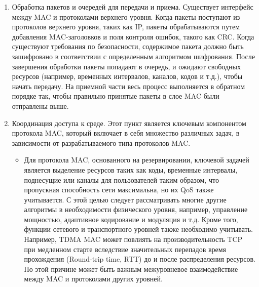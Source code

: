 \documentclass[14pt,a4paper,titlepage]{extarticle}
\begin{document}
\begin{enumerate}
\item Обработка пакетов и очередей для передачи и приема. Существует интерфейс между MAC и протоколами верхнего уровня. Когда пакеты поступают из протоколов верхнего уровня, таких как IP, пакеты обрабатываются путем добавления MAC-заголовков и поля контроля ошибок, такого как CRC. Когда существуют требования по безопасности, содержимое пакета должно быть зашифровано в соответствии с определенным алгоритмом шифрования. После завершения обработки пакеты попадают в очередь, и ожидают свободных ресурсов (например, временных интервалов, каналов, кодов и т.д.), чтобы начать передачу. На приемной части весь процесс выполняется в обратном порядке так, чтобы правильно принятые пакеты в слое MAC были отправлены выше.

\item Координация доступа к среде. Этот пункт является ключевым компонентом протокола MAC, который включает в себя множество различных задач, в зависимости от разрабатываемого типа протоколов MAC.

\begin{itemize}
\item Для протокола MAC, основанного на резервировании, ключевой задачей является выделение ресурсов таких как коды, временные интервалы, поднесущие или каналы для пользователей таким образом, что пропускная способность сети максимальна, но их QoS также учитывается. С этой целью следует рассматривать многие другие алгоритмы в необходимости физического уровня, например, управление мощностью, адаптивное кодирование и модуляция и т.д. Кроме того, функции сетевого и транспортного уровней также необходимо учитывать. Например, TDMA MAC может повлиять на производительность TCP при медленном старте вследствие значительных перепадов время прохождения (Round-trip time, RTT) до и после распределения ресурсов. По этой причине может быть важным межуровневое взаимодействие между MAC и протоколами других уровней.


\end{itemize}
\end{enumerate}
\end{document}

